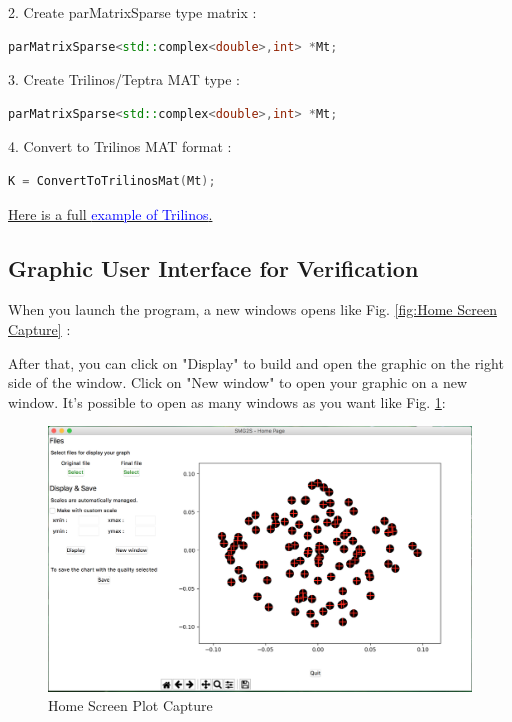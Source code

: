 2. Create parMatrixSparse type matrix :
\begin{lstlisting}[language=C++,frame=single]
parMatrixSparse<std::complex<double>,int> *Mt;
\end{lstlisting}

3. Create Trilinos/Teptra MAT type :
\begin{lstlisting}[language=C++,frame=single]
parMatrixSparse<std::complex<double>,int> *Mt;
\end{lstlisting}

4. Convert to Trilinos MAT format :
\begin{lstlisting}[language=C++,frame=single]
K = ConvertToTrilinosMat(Mt); 
\end{lstlisting}

\href{https://github.com/SMG2S/SMG2S/tree/master/example/teptra}{Here is a full \textcolor{blue}{ example of Trilinos}.}

\subsection{Graphic User Interface for Verification}

When you launch the program, a new windows opens like Fig. \ref{fig:Home Screen Capture} :

After that, you can click on "Display" to build and open the graphic on the right side of the window. Click on "New window" to open your graphic on a new window. It's possible to open as many windows as you want like Fig. \ref{fig:Home Screen Plot Capture}:

\begin{figure}[htbp]
	\label{fig:Home Screen Plot Capture}
	\caption{Home Screen Plot Capture}
	\centering
	\includegraphics[width=6.2in]{fig/home_screen.png}
\end{figure}


